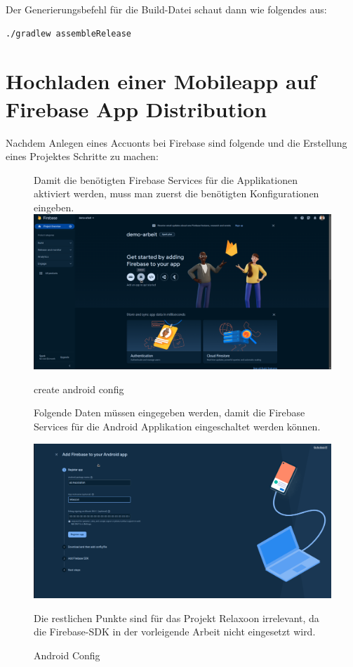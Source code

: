 Der Generierungsbefehl für die Build-Datei schaut dann wie folgendes aus:

\begin{lstlisting}[language=bash,caption=generate apk]
 ./gradlew assembleRelease
 \end{lstlisting}





\section{Hochladen einer Mobileapp auf Firebase App Distribution}

Nachdem Anlegen eines Accuonts bei Firebase sind folgende und die Erstellung eines Projektes Schritte zu machen:


\begin{figure}
  Damit die benötigten Firebase Services für die Applikationen aktiviert werden, muss man zuerst die benötigten Konfigurationen eingeben.
  \includegraphics[width=\textwidth]{./pics/firebase1.png}
  \caption{create android config}
\end{figure}



\begin{figure}
  Folgende Daten müssen eingegeben werden, damit die Firebase Services für die Android Applikation eingeschaltet werden können.

  \includegraphics[width=\textwidth]{./pics/firebase2.png}
  \caption{Android Config}
  Die restlichen Punkte sind für das Projekt Relaxoon irrelevant,
  da die Firebase-SDK in der vorleigende Arbeit nicht eingesetzt wird.
\end{figure}



